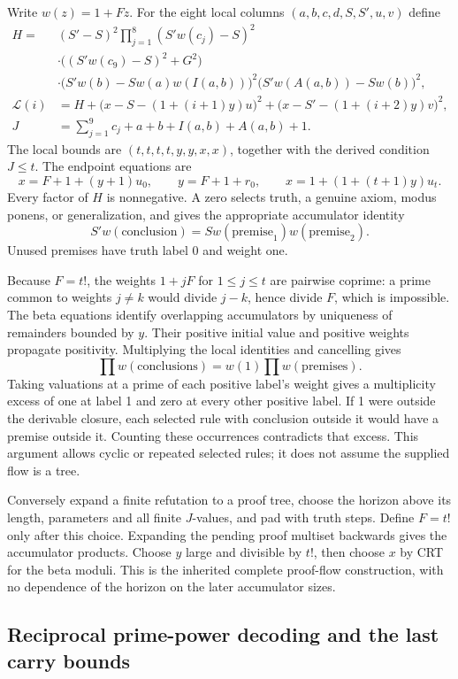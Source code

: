 Write $w(z)=1+Fz$. For the eight local columns
$(a,b,c,d,S,S',u,v)$ define
\begin{align*}
 H={}&(S'-S)^2\prod_{j=1}^{8}(S'w(c_j)-S)^2\\
 &\cdot\bigl((S'w(c_9)-S)^2+G^2\bigr)\\
 &\cdot\bigl(S'w(b)-Sw(a)w(I(a,b))\bigr)^2
       \bigl(S'w(A(a,b))-Sw(b)\bigr)^2,\\
 \mathcal L(i)&=H+\bigl(x-S-(1+(i+1)y)u\bigr)^2
                  +\bigl(x-S'-(1+(i+2)y)v\bigr)^2,\\
 J&=\sum_{j=1}^{9}c_j+a+b+I(a,b)+A(a,b)+1.
\end{align*}
The local bounds are $(t,t,t,t,y,y,x,x)$, together with the derived
condition $J\le t$. The endpoint equations are
\[
 x=F+1+(y+1)u_0,\qquad y=F+1+r_0,\qquad
 x=1+(1+(t+1)y)u_t.
\]
Every factor of $H$ is nonnegative. A zero selects truth, a genuine
axiom, modus ponens, or generalization, and gives the appropriate
accumulator identity
\[
 S'w(\text{conclusion})=Sw(\text{premise}_1)w(\text{premise}_2).
\]
Unused premises have truth label 0 and weight one.

Because $F=t!$, the weights $1+jF$ for $1\le j\le t$ are pairwise
coprime: a prime common to weights $j\ne k$ would divide $j-k$, hence
divide $F$, which is impossible. The beta equations identify overlapping
accumulators by uniqueness of remainders bounded by $y$. Their positive
initial value and positive weights propagate positivity. Multiplying the
local identities and cancelling gives
\[
 \prod w(\text{conclusions})=w(1)\prod w(\text{premises}).
\]
Taking valuations at a prime of each positive label's weight gives a
multiplicity excess of one at label 1 and zero at every other positive
label. If 1 were outside the derivable closure, each selected rule with
conclusion outside it would have a premise outside it. Counting these
occurrences contradicts that excess. This argument allows cyclic or
repeated selected rules; it does not assume the supplied flow is a tree.

Conversely expand a finite refutation to a proof tree, choose the horizon
above its length, parameters and all finite $J$-values, and pad with truth
steps. Define $F=t!$ only after this choice. Expanding the pending proof
multiset backwards gives the accumulator products. Choose $y$ large and
divisible by $t!$, then choose $x$ by CRT for the beta moduli. This is the
inherited complete proof-flow construction, with no dependence of the
horizon on the later accumulator sizes.

\subsection{Reciprocal prime-power decoding and the last carry bounds}

